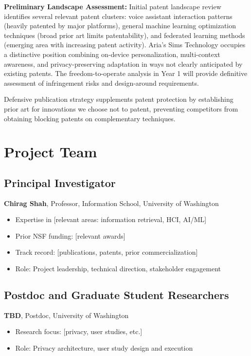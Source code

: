 \documentclass[11pt]{article}
\begin{document}
\textbf{Preliminary Landscape Assessment:}
Initial patent landscape review identifies several relevant patent clusters: voice assistant interaction patterns (heavily patented by major platforms), general machine learning optimization techniques (broad prior art limits patentability), and federated learning methods (emerging area with increasing patent activity). Aria's Sims Technology occupies a distinctive position combining on-device personalization, multi-context awareness, and privacy-preserving adaptation in ways not clearly anticipated by existing patents. The freedom-to-operate analysis in Year 1 will provide definitive assessment of infringement risks and design-around requirements.

Defensive publication strategy supplements patent protection by establishing prior art for innovations we choose not to patent, preventing competitors from obtaining blocking patents on complementary techniques.

\vspace*{-8pt}
\section{Project Team}
\label{sec:team}

\vspace*{-8pt}
\subsection{Principal Investigator}
\vspace*{-8pt}
\textbf{Chirag Shah}, Professor, Information School, University of Washington
\begin{itemize}[noitemsep]
    \item Expertise in [relevant areas: information retrieval, HCI, AI/ML]
    \item Prior NSF funding: [relevant awards]
    \item Track record: [publications, patents, prior commercialization]
    \item Role: Project leadership, technical direction, stakeholder engagement
\end{itemize}

\subsection{Postdoc and Graduate Student Researchers}
\textbf{TBD}, Postdoc, University of Washington
\begin{itemize}[noitemsep]
    \item Research focus: [privacy, user studies, etc.]
    \item Role: Privacy architecture, user study design and execution
\end{itemize}
\end{document}
